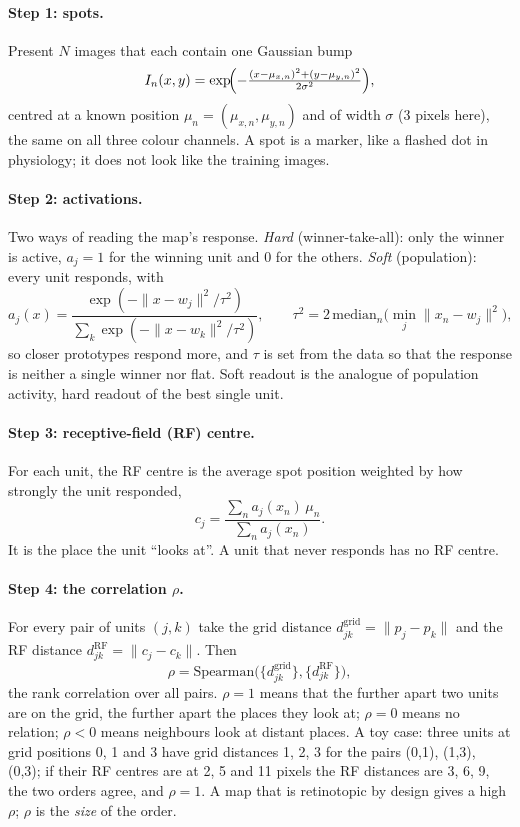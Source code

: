 \documentclass[11pt,a4paper]{article}
\begin{document}
\paragraph{Step 1: spots.} Present $N$ images that each contain one Gaussian bump
\begin{equation}
  I_n(x,y)=\exp\!\Bigl(-\tfrac{(x-\mu_{x,n})^2+(y-\mu_{y,n})^2}{2\sigma^2}\Bigr),
\end{equation}
centred at a known position $\mu_n=(\mu_{x,n},\mu_{y,n})$ and of width $\sigma$
(3 pixels here), the same on all three colour channels. A spot is a marker, like a
flashed dot in physiology; it does not look like the training images.

\paragraph{Step 2: activations.} Two ways of reading the map's response.
\emph{Hard} (winner-take-all): only the winner is active, $a_j=1$ for the winning
unit and 0 for the others. \emph{Soft} (population): every unit responds, with
\begin{equation}
  a_j(x)=\frac{\exp(-\|x-w_j\|^2/\tau^2)}{\sum_k\exp(-\|x-w_k\|^2/\tau^2)},\qquad
  \tau^2=2\,\mathrm{median}_n\bigl(\min_j\|x_n-w_j\|^2\bigr),
\end{equation}
so closer prototypes respond more, and $\tau$ is set from the data so that the
response is neither a single winner nor flat. Soft readout is the analogue of
population activity, hard readout of the best single unit.

\paragraph{Step 3: receptive-field (RF) centre.} For each unit, the RF centre is the
average spot position weighted by how strongly the unit responded,
\begin{equation}
  c_j=\frac{\sum_n a_j(x_n)\,\mu_n}{\sum_n a_j(x_n)} .
\end{equation}
It is the place the unit ``looks at''. A unit that never responds has no RF centre.

\paragraph{Step 4: the correlation $\rho$.} For every pair of units $(j,k)$ take the
grid distance $d^{\mathrm{grid}}_{jk}=\|p_j-p_k\|$ and the RF distance
$d^{\mathrm{RF}}_{jk}=\|c_j-c_k\|$. Then
\begin{equation}
  \rho=\mathrm{Spearman}\bigl(\{d^{\mathrm{grid}}_{jk}\},\{d^{\mathrm{RF}}_{jk}\}\bigr),
\end{equation}
the rank correlation over all pairs. $\rho=1$ means that the further apart two units
are on the grid, the further apart the places they look at; $\rho=0$ means no
relation; $\rho<0$ means neighbours look at distant places. A toy case: three units
at grid positions 0, 1 and 3 have grid distances 1, 2, 3 for the pairs (0,1), (1,3),
(0,3); if their RF centres are at 2, 5 and 11 pixels the RF distances are 3, 6, 9,
the two orders agree, and $\rho=1$. A map that is retinotopic by design gives a high
$\rho$; $\rho$ is the \emph{size} of the order.
\end{document}
